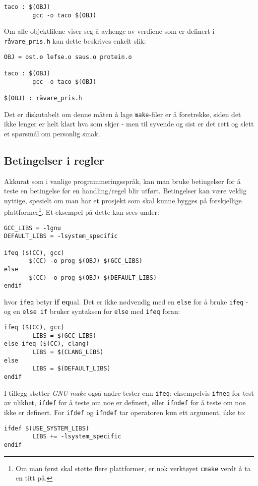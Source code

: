\begin{alphasection}
\begin{lstlisting}
taco : $(OBJ)
        gcc -o taco $(OBJ)
\end{lstlisting}


Om alle objektfilene viser seg å avhenge av verdiene som er definert i \texttt{råvare\_pris.h}  kan dette beskrives enkelt slik:

\begin{lstlisting}
OBJ = ost.o lefse.o saus.o protein.o

taco : $(OBJ)
        gcc -o taco $(OBJ)
        
$(OBJ) : råvare_pris.h
\end{lstlisting}


Det er diskutabelt om denne måten å lage \verb|make|-filer er å foretrekke, siden
det ikke lenger er helt klart hva som skjer - men til syvende og sist er det
rett og slett et spørsmål om personlig smak.

\subsection{Betingelser i regler}

Akkurat som i vanlige programmeringsspråk, kan man bruke betingelser for å teste en betingelse før en handling/regel blir utført. Betingelser kan være veldig nyttige, spesielt om man har et prosjekt som skal kunne bygges på forskjellige plattformer\footnote{Om man først skal støtte flere plattformer, er nok verktøyet \texttt{cmake} verdt å ta en titt på.}. Et eksempel på dette kan sees under: 

\begin{verbatim}
GCC_LIBS = -lgnu
DEFAULT_LIBS = -lsystem_specific

ifeq ($(CC), gcc)
       $(CC) -o prog $(OBJ) $(GCC_LIBS)
else
       $(CC) -o prog $(OBJ) $(DEFAULT_LIBS)
endif
\end{verbatim}


hvor \verb|ifeq| betyr \textbf{if eq}ual. Det er ikke nødvendig med en \verb|else| for å bruke \verb|ifeq| - og en \verb|else if| bruker syntaksen for \verb|else| med \verb|ifeq| foran: 

\begin{lstlisting}
ifeq ($(CC), gcc)
        LIBS = $(GCC_LIBS)
else ifeq ($(CC), clang)
        LIBS = $(CLANG_LIBS)
else
        LIBS = $(DEFAULT_LIBS)
endif
\end{lstlisting}

I tillegg støtter \textit{GNU make} også andre tester enn \verb|ifeq|: eksempelvis \verb|ifneq| for test av ulikhet, \verb|ifdef| for å teste om noe er definert, eller \verb|ifndef| for å teste om noe ikke er definert. For \verb|ifdef| og \verb|ifndef| tar operatoren kun ett argument, ikke to:

\begin{lstlisting}
ifdef $(USE_SYSTEM_LIBS)
        LIBS += -lsystem_specific
endif
\end{lstlisting}

\end{alphasection}              


\setcounter{section}{0}